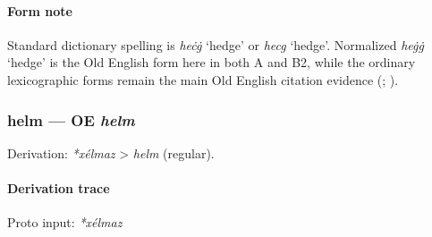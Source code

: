 \documentclass[
  british,
  a4paper,
]{article}
\begin{document}
\paragraph{Form note}\label{form-note-6}

Standard dictionary spelling is \emph{heċġ} `hedge' or \emph{hecg}
`hedge'. Normalized \emph{heġġ} `hedge' is the Old English form here in
both A and B2, while the ordinary lexicographic forms remain the main
Old English citation evidence
(;
).

\subsubsection{\texorpdfstring{helm --- OE
\emph{helm}}{helm --- OE helm}}\label{helm-oe-helm}

Derivation: \emph{*xélmaz} \textgreater{} \emph{helm} (regular).

\paragraph{Derivation trace}\label{derivation-trace-42}

Proto input: \emph{*xélmaz}

\begingroup
\setlength{\fboxsep}{6pt}
\end{document}
